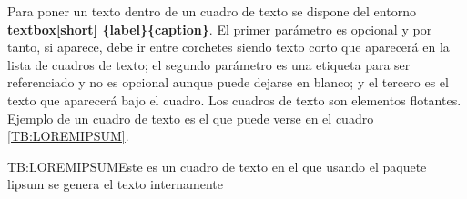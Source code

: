 Para poner un texto dentro de un cuadro de texto se dispone del entorno \textbf{textbox{[short]} \{label\}\{caption\}}. El primer parámetro es opcional y por tanto, si aparece, debe ir entre corchetes siendo texto corto que aparecerá en la lista de cuadros de texto; el segundo parámetro es una etiqueta para ser referenciado y no es opcional aunque puede dejarse en blanco; y el tercero es el texto que aparecerá bajo el cuadro. Los cuadros de texto son elementos flotantes. Ejemplo de un cuadro de texto es el que puede verse en el cuadro \ref{TB:LOREMIPSUM}.

\begin{textbox}{TB:LOREMIPSUM}{Este es un cuadro de texto en el que usando el paquete lipsum se genera el texto internamente}
  \lipsum[1]
\end{textbox}
